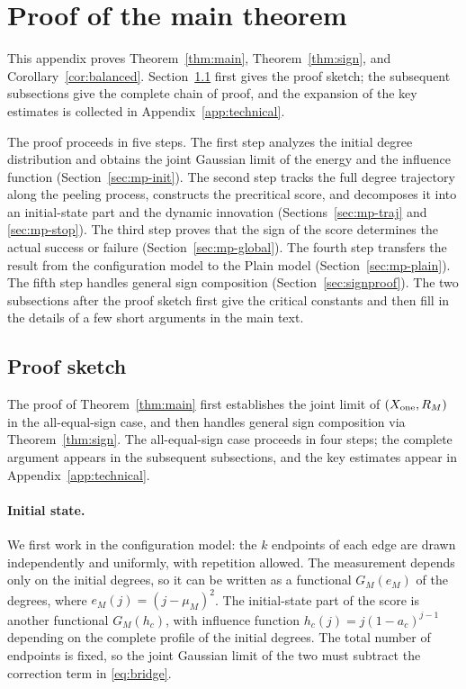 \section{Proof of the main theorem}\label{sec:main-proof}
This appendix proves Theorem~\ref{thm:main}, Theorem~\ref{thm:sign}, and Corollary~\ref{cor:balanced}.
Section~\ref{sec:proof-sketch} first gives the proof sketch; the subsequent subsections give the complete
chain of proof, and the expansion of the key estimates is collected in Appendix~\ref{app:technical}.

The proof proceeds in five steps. The first step analyzes the initial degree distribution and obtains the
joint Gaussian limit of the energy and the influence function (Section~\ref{sec:mp-init}). The second step
tracks the full degree trajectory along the peeling process, constructs the precritical score, and decomposes
it into an initial-state part and the dynamic innovation (Sections~\ref{sec:mp-traj} and \ref{sec:mp-stop}).
The third step proves that the sign of the score determines the actual success or failure
(Section~\ref{sec:mp-global}). The fourth step transfers the result from the configuration model to the
Plain model (Section~\ref{sec:mp-plain}). The fifth step handles general sign composition
(Section~\ref{sec:signproof}). The two subsections after the proof sketch first give the critical constants
and then fill in the details of a few short arguments in the main text.

\subsection{Proof sketch}\label{sec:proof-sketch}
The proof of Theorem~\ref{thm:main} first establishes the joint limit of $(X_{\rm one},R_M)$ in the
all-equal-sign case, and then handles general sign composition via Theorem~\ref{thm:sign}. The
all-equal-sign case proceeds in four steps; the complete argument appears in the subsequent subsections, and
the key estimates appear in Appendix~\ref{app:technical}.

\paragraph{Initial state.} We first work in the configuration model: the $k$ endpoints of each edge are
drawn independently and uniformly, with repetition allowed. The measurement depends only on the initial
degrees, so it can be written as a functional $G_M(e_M)$ of the degrees, where $e_M(j)=(j-\mu_M)^2$. The
initial-state part of the score is another functional $G_M(h_c)$, with influence function
$h_c(j)=j(1-a_c)^{j-1}$ depending on the complete profile of the initial degrees. The total number of
endpoints is fixed, so the joint Gaussian limit of the two must subtract the correction term in
\eqref{eq:bridge}.

